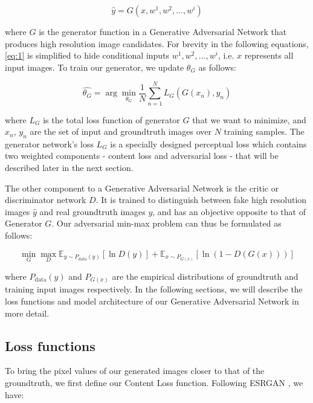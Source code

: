 \documentclass[tc, manuscript]{copernicus}
\begin{document}
\begin{equation}\label{eq:1}
  \hat{y} = G(x, w^1, w^2, \dots, w^i)
\end{equation}

where $G$ is the generator function in a Generative Adversarial Network that produces high resolution image candidates.
For brevity in the following equations, \eqref{eq:1} is simplified to hide conditional inputs $w^1, w^2, \dots, w^i$, i.e. $x$ represents all input images.
To train our generator, we update $\theta_G$ as follows:

\begin{equation}\label{eq:2}
  \hat{\theta_G} = \arg\min_{\theta_G} \frac{1}{N}\sum_{n=1}^{N}L_G(G(x_n), y_n)
\end{equation}

where $L_G$ is the total loss function of generator $G$ that we want to minimize, and $x_n$, $y_n$ are the set of input and groundtruth images over $N$ training samples.
The generator network's loss $L_G$ is a specially designed perceptual loss which contains two weighted components - content loss and adversarial loss - that will be described later in the next section.

The other component to a Generative Adversarial Network is the critic or discriminator network $D$.
It is trained to distinguish between fake high resolution images $\hat{y}$ and real groundtruth images $y$, and has an objective opposite to that of Generator $G$.
Our adversarial min-max problem can thus be formulated as follows:

\begin{equation}\label{eq:3}
  \min_{G} \max_{D} \mathbb{E}_{y \sim P_{\text{data}}(y)}[\ln D(y)] + \mathbb{E}_{x \sim P_{G(x)}}[\ln(1-D(G(x)))]
\end{equation}

where $P_{\text{data}}(y)$ and $P_{G(x)}$ are the empirical distributions of groundtruth and training input images respectively.
In the following sections, we will describe the loss functions and model architecture of our Generative Adversarial Network in more detail.

\subsection{Loss functions}

To bring the pixel values of our generated images closer to that of the groundtruth, we first define our Content Loss function.
Following ESRGAN \citep{WangESRGANEnhancedSuperResolution2018}, we have:
\end{document}
